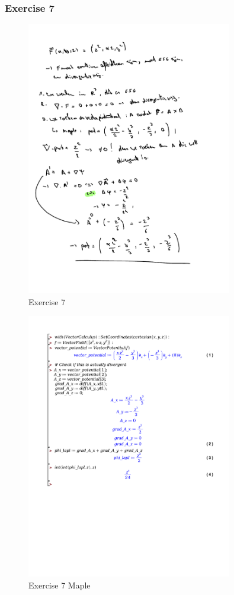 \documentclass[a4paper]{report}
\begin{document}
\subsubsection{Exercise 7}

\begin{figure}[H]
	\centering
	\includegraphics[width=0.8\textwidth]{assets/huis_6_ex_7.pdf}
	\caption{Exercise 7}
	\label{fig:huis_6_ex_7}
\end{figure}

\begin{figure}[H]
	\centering
	\includegraphics[width=0.8\textwidth]{exercises/huis_6_ex_7.pdf}
	\caption{Exercise 7 Maple}
\end{figure}
\end{document}
